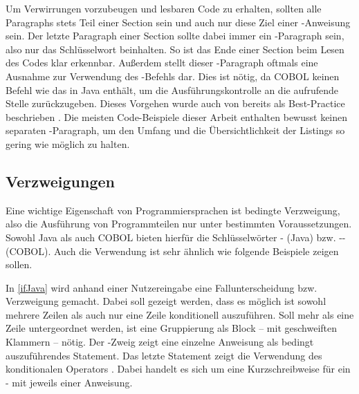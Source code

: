 Um Verwirrungen vorzubeugen und lesbaren Code zu erhalten, sollten alle Paragraphs stets Teil einer Section sein und auch nur diese Ziel einer -Anweisung sein. Der letzte Paragraph einer Section sollte dabei immer ein -Paragraph sein, also nur das Schlüsselwort  beinhalten. So ist das Ende einer Section beim Lesen des Codes klar erkennbar. Außerdem stellt dieser -Paragraph oftmals eine Ausnahme zur Verwendung des -Befehls dar. Dies ist nötig, da COBOL keinen Befehl wie das  in Java enthält, um die Ausführungskontrolle an die aufrufende Stelle zurückzugeben. Dieses Vorgehen wurde auch von \citeauthor{richards_enhancing_1984} bereits \citeyear{richards_enhancing_1984} als Best-Practice beschrieben  \cite{richards_enhancing_1984}. Die meisten Code-Beispiele dieser Arbeit enthalten bewusst keinen separaten -Paragraph, um den Umfang und die Übersichtlichkeit der Listings so gering wie möglich zu halten. 

\subsection{Verzweigungen}
Eine wichtige Eigenschaft von Programmiersprachen ist bedingte Verzweigung, also die Ausführung von Programmteilen nur unter bestimmten Voraussetzungen. Sowohl Java als auch COBOL bieten hierfür die Schlüsselwörter - (Java) bzw. -- (COBOL). Auch die Verwendung ist sehr ähnlich wie folgende Beispiele zeigen sollen.


In \autoref{ifJava} wird anhand einer Nutzereingabe eine Fallunterscheidung bzw. Verzweigung gemacht. Dabei soll gezeigt werden, dass es möglich ist sowohl mehrere Zeilen als auch nur eine Zeile konditionell auszuführen. Soll mehr als eine Zeile untergeordnet werden, ist eine Gruppierung als Block -- mit geschweiften Klammern -- nötig. Der -Zweig zeigt eine einzelne Anweisung als bedingt auszuführendes Statement. Das letzte Statement zeigt die Verwendung des konditionalen Operators . Dabei handelt es sich um eine Kurzschreibweise für ein - mit jeweils einer Anweisung. 


